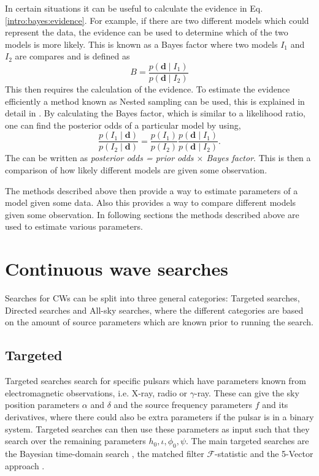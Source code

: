 In certain situations it can be useful to calculate the evidence in Eq.\ref{intro:bayes:evidence}. 
For example, if there are two different models which could represent the data, the evidence can be used to determine which of the two models is more likely.
This is known as a Bayes factor where two models $I_1$ and $I_2$ are compares and is defined as
\begin{equation}
B = \frac{p({\bm d} \mid I_1)}{p({\bm d} \mid I_2)}
\end{equation}
This then requires the calculation of the evidence.
To estimate the evidence efficiently a method known as Nested sampling can be used, this is explained in detail in \citep{skilling2006NestedSampling,speagle2019DynestyDynamic}.
By calculating the Bayes factor, which is similar to a likelihood ratio, one can find the posterior odds of a particular model by using,
\begin{equation}
\frac{p(I_1 \mid \mathbf{d})}{p(I_2 \mid \mathbf{d})} = \frac{p(I_1)}{p(I_2)} \frac{p(\mathbf{d} \mid I_1)}{p(\mathbf{d} \mid I_2)}.
\end{equation}
The can be written as \textit{posterior odds = prior odds $\times$ Bayes factor}. This is then a comparison of how likely different models are given some observation. 

The methods described above then provide a way to estimate parameters of a model given some data. 
Also this provides a way to compare different models given some observation.
In following sections the methods described above are used to estimate various parameters.


\section{\label{searchcw:search} Continuous wave searches}

Searches for \glspl{CW} can be split into three general categories: Targeted searches, Directed searches and All-sky searches, where the different categories are based on the amount of source parameters which are known prior to running the search.

\subsection{\label{searchcw:search:targeted}Targeted}

Targeted searches search for specific pulsars which have parameters known from electromagnetic observations, i.e. X-ray, radio or $\gamma$-ray.
These can give the sky position parameters $\alpha$ and $\delta$ and the source frequency parameters $f$ and its derivatives, where there could also be extra parameters if the pulsar is in a binary system.
Targeted searches can then use these parameters as input such that they search over the remaining parameters $h_0, \iota, \phi_0, \psi$.
The main targeted searches are the Bayesian time-domain search \citep{dupuis2005BayesianEstimation}, the matched filter $\mathcal{F}$-statistic \citep{schutz1998DataAnalysis} and the 5-Vector approach \citep{astone2010MethodDetection}.

